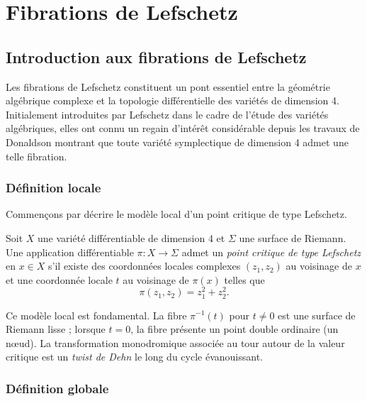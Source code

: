 \chapter{Fibrations de Lefschetz}

\section{Introduction aux fibrations de Lefschetz}

Les fibrations de Lefschetz constituent un pont essentiel entre la géométrie algébrique complexe et la topologie différentielle des variétés de dimension 4. Initialement introduites par Lefschetz dans le cadre de l'étude des variétés algébriques, elles ont connu un regain d'intérêt considérable depuis les travaux de Donaldson \cite{Donaldson99} montrant que toute variété symplectique de dimension 4 admet une telle fibration.

\subsection{Définition locale}

Commençons par décrire le modèle local d'un point critique de type Lefschetz.

\begin{definition}
Soit $X$ une variété différentiable de dimension 4 et $\Sigma$ une surface de Riemann. Une application différentiable $\pi: X \to \Sigma$ admet un \emph{point critique de type Lefschetz} en $x \in X$ s'il existe des coordonnées locales complexes $(z_1, z_2)$ au voisinage de $x$ et une coordonnée locale $t$ au voisinage de $\pi(x)$ telles que
\[
\pi(z_1, z_2) = z_1^2 + z_2^2.\]
\end{definition}

Ce modèle local est fondamental. La fibre $\pi^{-1}(t)$ pour $t \neq 0$ est une surface de Riemann lisse ; lorsque $t = 0$, la fibre présente un point double ordinaire (un nœud). La transformation monodromique associée au tour autour de la valeur critique est un \emph{twist de Dehn} le long du cycle évanouissant.

\subsection{Définition globale}

